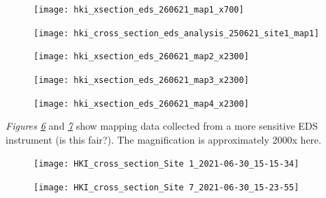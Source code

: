 

\begin{figure}[H]
\centering
  \texttt{[image: hki\_xsection\_eds\_260621\_map1\_x700]}
\label{fig:xsection_map1}
\end{figure}

\begin{figure}[H]
\centering
  \texttt{[image: hki\_cross\_section\_eds\_analysis\_250621\_site1\_map1]}
\label{fig:xsection_map2}
\end{figure}

\begin{figure}[H]
\centering
  \texttt{[image: hki\_xsection\_eds\_260621\_map2\_x2300]}
\label{fig:xsection_map3}
\end{figure}

\begin{figure}[H]
\centering
  \texttt{[image: hki\_xsection\_eds\_260621\_map3\_x2300]}
\label{fig:xsection_map4}
\end{figure}

\begin{figure}[H]
\centering
  \texttt{[image: hki\_xsection\_eds\_260621\_map4\_x2300]}
\label{fig:xsection_map5}
\end{figure}

\textit{Figures \ref{fig:xsection_map6}} and \textit{\ref{fig:xsection_map7}} show mapping data collected from a more sensitive EDS instrument (is this fair?). The magnification is approximately 2000x here.

\begin{figure}[H]
\centering
  \texttt{[image: HKI\_cross\_section\_Site 1\_2021-06-30\_15-15-34]}
\label{fig:xsection_map6}
\end{figure}

\begin{figure}[H]
\centering
  \texttt{[image: HKI\_cross\_section\_Site 7\_2021-06-30\_15-23-55]}
\label{fig:xsection_map7}
\end{figure}





